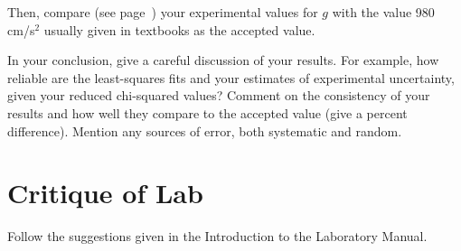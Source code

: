 Then, compare (see page~\pageref{scierror}) your experimental values
for $g$
with the value 980 cm/s$^{2}$ usually given in textbooks as the
accepted value.

In your conclusion, give a careful discussion of your results.
For example, how reliable are the least-squares fits and your
estimates of experimental uncertainty, given your reduced chi-squared
values?
Comment on the consistency of your results and how well they compare to the
accepted value (give a percent difference).  Mention any sources of error, both
systematic and random.


\section*{Critique of Lab}
     Follow the suggestions given in the Introduction to the
Laboratory Manual.
